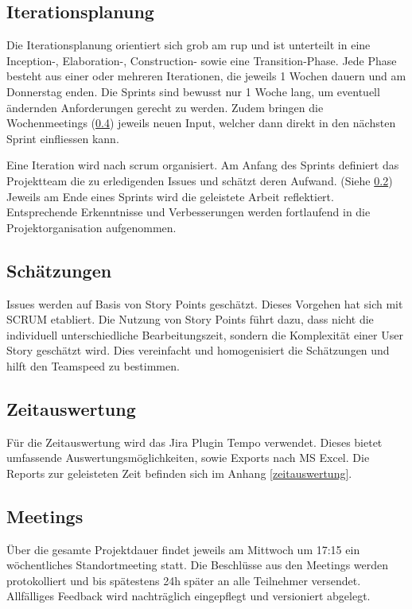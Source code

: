 \documentclass[11pt,a4paper,english,oneside]{book}
\numberwithin{equation}{chapter}
\begin{document}
	
	\subsection{Iterationsplanung}
	Die Iterationsplanung orientiert sich grob am \gls{rup} und ist unterteilt in eine Inception-, Elaboration-, Construction- sowie eine Transition-Phase. Jede Phase besteht aus einer oder mehreren Iterationen, die jeweils 1 Wochen dauern und am Donnerstag enden. Die Sprints sind bewusst nur 1 Woche lang, um eventuell ändernden Anforderungen gerecht zu werden. Zudem bringen die Wochenmeetings (\ref{ssec:meeting}) jeweils neuen Input, welcher dann direkt in den nächsten Sprint einfliessen kann.
	
	Eine Iteration wird nach \gls{scrum} organisiert. Am Anfang des Sprints definiert das Projektteam die zu erledigenden Issues und schätzt deren Aufwand. (Siehe \ref{sec:estimations}) Jeweils am Ende eines Sprints wird die geleistete Arbeit reflektiert. Entsprechende Erkenntnisse und Verbesserungen werden fortlaufend in die Projektorganisation aufgenommen. 
	
	\subsection{Schätzungen}
	\label{sec:estimations}
	Issues werden auf Basis von Story Points geschätzt. Dieses Vorgehen hat sich mit SCRUM etabliert. Die Nutzung von Story Points führt dazu, dass nicht die individuell unterschiedliche Bearbeitungszeit, sondern die Komplexität einer User Story geschätzt wird. Dies vereinfacht  und homogenisiert die Schätzungen und hilft den Teamspeed zu bestimmen.\cite{storypoints, storypoints2}
	
	\subsection{Zeitauswertung}
	Für die Zeitauswertung wird das Jira Plugin Tempo \cite{jiratempo} verwendet. Dieses bietet umfassende Auswertungsmöglichkeiten, sowie Exports nach MS Excel. Die Reports zur geleisteten Zeit befinden sich im Anhang \ref{zeitauswertung}.
	
	\subsection{Meetings} \label{ssec:meeting}
	Über die gesamte Projektdauer findet jeweils am Mittwoch um 17:15 ein wöchentliches Standortmeeting statt. Die Beschlüsse aus den Meetings werden protokolliert und bis spätestens 24h später an alle Teilnehmer versendet. Allfälliges Feedback wird nachträglich eingepflegt und versioniert abgelegt.
	
\end{document}
